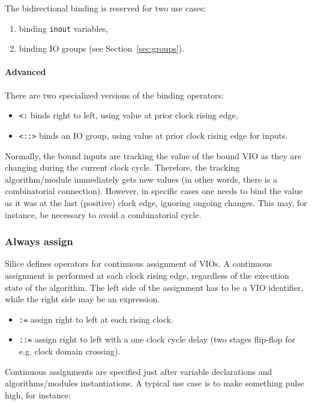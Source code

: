 \documentclass[a4]{article}
\newcommand\silice{Silice}
\begin{document}
The bidirectional binding is reserved for two use cases:
\begin{enumerate}
\item binding \texttt{inout} variables,
\item binding IO groups (see Section~\ref{sec:groups}).
\end{enumerate}

\paragraph{Advanced}

There are two specialized versions of the binding operators:
\begin{itemize}
	\item \texttt{<:} binds right to left, using value at prior clock rising edge,
	\item \texttt{<::>} binds an IO group, using value at prior clock rising edge for inputs.
\end{itemize}

Normally, the bound inputs are tracking the value of the bound VIO as they are changing during the current clock cycle. Therefore, the tracking algorithm/module immediately gets new values (in other words, there is a combinatorial connection). However, in specific cases one needs to bind the value as it was at the last (positive) clock edge, ignoring ongoing changes. This may, for instance, be necessary to avoid a combinatorial cycle.

\subsubsection{Always assign}
\label{sec:contassign}

\silice{} defines operators for continuous assignment of VIOs.
A continuous assignment is performed at each clock rising edge, regardless of the execution state of the algorithm. The left side of the assignment has to be a VIO identifier, while the right side may be an expression.
\begin{itemize}
\item \texttt{:=} assign right to left at each rising clock.
\item \texttt{::=} assign right to left with a one clock cycle delay (two stages flip-flop for e.g. clock domain crossing).
\end{itemize}

Continuous assignments are specified just after variable declarations and algorithms/modules instantiations. A typical use case is to make something pulse high, for instance:
\end{document}
